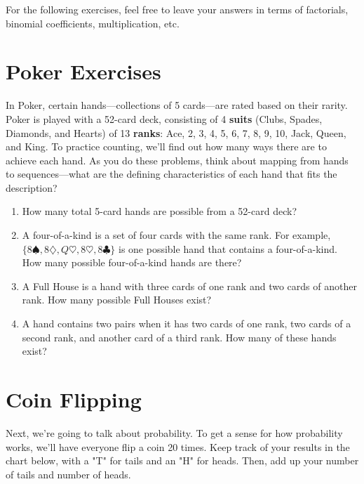 \documentclass[a4paper]{article}
\begin{document}
\noindent For the following exercises, feel free to leave your answers in terms of factorials, binomial coefficients, multiplication, etc. 

\newpage
\section{Poker Exercises}
In Poker, certain hands---collections of 5 cards---are rated based on their rarity. Poker is played with a 52-card deck, consisting of 4 \textbf{suits} (Clubs, Spades, Diamonds, and Hearts) of 13 \textbf{ranks}: Ace, 2, 3, 4, 5, 6, 7, 8, 9, 10, Jack, Queen, and King. To practice counting, we'll find out how many ways there are to achieve each hand. As you do these problems, think about mapping from hands to sequences---what are the defining characteristics of each hand that fits the description?

\begin{enumerate}[itemsep=40mm,after=\vspace{50mm}]
    \item How many total 5-card hands are possible from a 52-card deck?
    
    \item A four-of-a-kind is a set of four cards with the same rank. For example, $\{8\spadesuit, 8\diamondsuit, Q\heartsuit, 8\heartsuit, 8\clubsuit\}$ is one possible hand that contains a four-of-a-kind. How many possible four-of-a-kind hands are there?
    
    \item A Full House is a hand with three cards of one rank and two cards of another rank. How many possible Full Houses exist?
    
    \item A hand contains two pairs when it has two cards of one rank, two cards of a second rank, and another card of a third rank. How many of these hands exist?
\end{enumerate}
 
 \newpage
 \section{Coin Flipping}
 Next, we're going to talk about probability. To get a sense for how probability works, we'll have everyone flip a coin 20 times. Keep track of your results in the chart below, with a "T" for tails and an "H" for heads. Then, add up your number of tails and number of heads. \vspace{5mm}
 
\end{document}
